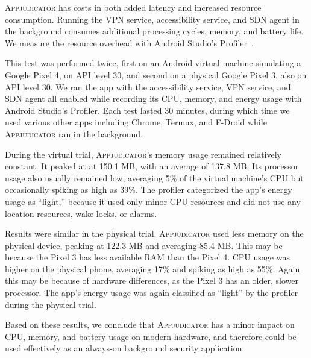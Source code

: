 \textsc{Appjudicator} has costs in both added latency and increased resource
consumption. Running the VPN service, accessibility service, and SDN agent in
the background consumes additional processing cycles, memory, and battery life.
We measure the resource overhead with Android Studio's
Profiler~\cite{androidprofiler}.

This test was performed twice, first on an Android virtual machine simulating a
Google Pixel 4, on API level 30, and second on a physical Google Pixel 3, also
on API level 30. We ran the app with the accessibility service, VPN service, and
SDN agent all enabled while recording its CPU, memory, and energy usage with
Android Studio's Profiler. Each test lasted 30 minutes, during which time we
used various other apps including Chrome, Termux, and F-Droid while
\textsc{Appjudicator} ran in the background.

During the virtual trial, \textsc{Appjudicator}'s memory usage remained
relatively constant. It peaked at at 150.1 MB, with an average of 137.8 MB. Its
processor usage also usually remained low, averaging 5\% of the virtual
machine's CPU but occasionally spiking as high as 39\%. The profiler categorized
the app's energy usage as ``light,'' because it used only minor CPU resources
and did not use any location resources, wake locks, or alarms.

Results were similar in the physical trial. \textsc{Appjudicator} used less
memory on the physical device, peaking at 122.3 MB and averaging 85.4 MB. This
may be because the Pixel 3 has less available RAM than the Pixel 4. CPU usage
was higher on the physical phone, averaging 17\% and spiking as high as 55\%.
Again this may be because of hardware differences, as the Pixel 3 has an older,
slower processor. The app's energy usage was again classified as ``light'' by
the profiler during the physical trial. 

Based on these results, we conclude that \textsc{Appjudicator} has a minor
impact on CPU, memory, and battery usage on modern hardware, and therefore could
be used effectively as an always-on background security application.

\newpage

